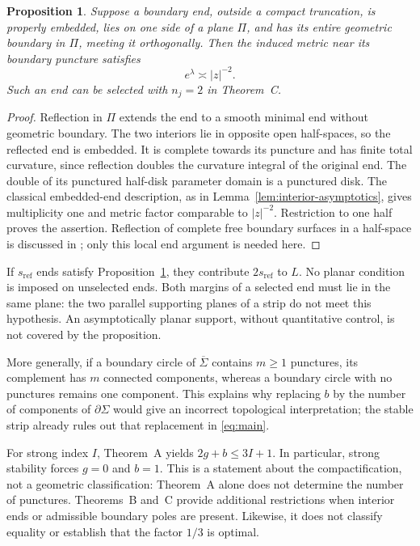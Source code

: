 \documentclass[11pt]{amsart}
\numberwithin{equation}{section}
\newtheorem{proposition}[theorem]{Proposition}
\theoremstyle{definition}
\theoremstyle{remark}
\newcommand{\Sigmabar}{\overline\Sigma}
\begin{document}
\begin{proposition}\label{prop:reflection}
Suppose a boundary end, outside a compact truncation, is properly embedded, lies on one side of a plane $\Pi$, and has its entire geometric boundary in $\Pi$, meeting it orthogonally. Then the induced metric near its boundary puncture satisfies
\[
e^\lambda\asymp|z|^{-2}.
\]
Such an end can be selected with $n_j=2$ in Theorem~C.
\end{proposition}
\begin{proof}
Reflection in $\Pi$ extends the end to a smooth minimal end without geometric boundary. The two interiors lie in opposite open half-spaces, so the reflected end is embedded. It is complete towards its puncture and has finite total curvature, since reflection doubles the curvature integral of the original end. The double of its punctured half-disk parameter domain is a punctured disk. The classical embedded-end description, as in Lemma~\ref{lem:interior-asymptotics}, gives multiplicity one and metric factor comparable to $|z|^{-2}$. Restriction to one half proves the assertion. Reflection of complete free boundary surfaces in a half-space is discussed in \cite[Section~2]{Chen21}; only this local end argument is needed here.
\end{proof}

If $s_{\mathrm{ref}}$ ends satisfy Proposition~\ref{prop:reflection}, they contribute $2s_{\mathrm{ref}}$ to $L$. No planar condition is imposed on unselected ends. Both margins of a selected end must lie in the same plane: the two parallel supporting planes of a strip do not meet this hypothesis. An asymptotically planar support, without quantitative control, is not covered by the proposition.

More generally, if a boundary circle of $\Sigmabar$ contains $m\ge1$ punctures, its complement has $m$ connected components, whereas a boundary circle with no punctures remains one component. This explains why replacing $b$ by the number of components of $\partial\Sigma$ would give an incorrect topological interpretation; the stable strip already rules out that replacement in \eqref{eq:main}.

For strong index $I$, Theorem~A yields $2g+b\le3I+1$. In particular, strong stability forces $g=0$ and $b=1$. This is a statement about the compactification, not a geometric classification: Theorem~A alone does not determine the number of punctures. Theorems~B and~C provide additional restrictions when interior ends or admissible boundary poles are present. Likewise, it does not classify equality or establish that the factor $1/3$ is optimal.
\end{document}
